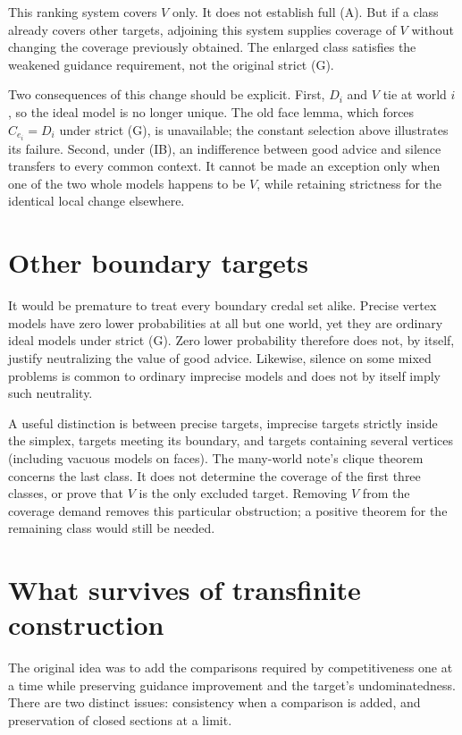 \documentclass[11pt]{article}
\theoremstyle{remark}\newtheorem{remark}[proposition]{Remark}
\begin{document}
This ranking system covers $V$ only. It does not establish full (A).
But if a class already covers other targets, adjoining this system
supplies coverage of $V$ without changing the coverage previously
obtained. The enlarged class satisfies the weakened guidance
requirement, not the original strict (G).

Two consequences of this change should be explicit. First, $D_i$ and
$V$ tie at world $i$, so the ideal model is no longer unique. The old
face lemma, which forces $C_{e_i}=D_i$ under strict (G), is unavailable;
the constant selection above illustrates its failure. Second, under
(IB), an indifference between good advice and silence transfers to
every common context. It cannot be made an exception only when one of
the two whole models happens to be $V$, while retaining strictness for
the identical local change elsewhere.

\section{Other boundary targets}

It would be premature to treat every boundary credal set alike.
Precise vertex models have zero lower probabilities at all but one
world, yet they are ordinary ideal models under strict (G). Zero lower
probability therefore does not, by itself, justify neutralizing the
value of good advice. Likewise, silence on some mixed problems is
common to ordinary imprecise models and does not by itself imply such
neutrality.

A useful distinction is between precise targets, imprecise targets
strictly inside the simplex, targets meeting its boundary, and targets
containing several vertices (including vacuous models on faces).
The many-world note's clique theorem concerns the last class. It does
not determine the coverage of the first three classes, or prove that
$V$ is the only excluded target. Removing $V$ from the coverage demand
removes this particular obstruction; a positive theorem for the
remaining class would still be needed.

\section{What survives of transfinite construction}

The original idea was to add the comparisons required by competitiveness
one at a time while preserving guidance improvement and the target's
undominatedness. There are two distinct issues: consistency when a
comparison is added, and preservation of closed sections at a limit.
\end{document}
